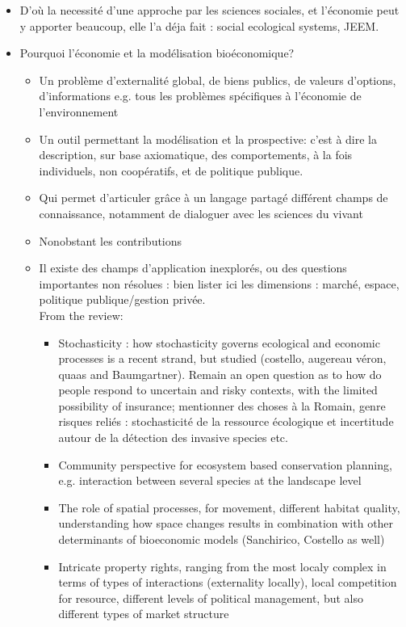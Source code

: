 \begin{itemize}
\item D'où la necessité d'une approche par les sciences sociales, et l'économie peut y apporter beaucoup, elle l'a déja fait : social ecological systems, JEEM. 
\item Pourquoi l'économie et la modélisation bioéconomique?
\begin{itemize}
\item Un problème d'externalité global, de biens publics, de valeurs d'options, d'informations e.g. tous les problèmes spécifiques à l'économie de l'environnement
\item Un outil permettant la modélisation et la prospective: c'est à dire la description, sur base axiomatique, des comportements, à la fois individuels, non coopératifs, et de politique publique. 
\item Qui permet d'articuler grâce à un langage partagé différent champs de connaissance, notamment de dialoguer avec les sciences du vivant
\item Nonobstant les contributions
\item Il existe des champs d'application inexplorés, ou des questions importantes non résolues : bien lister ici les dimensions : marché, espace, politique publique/gestion privée. \\
From the review:
\begin{itemize}
\item Stochasticity : how stochasticity governs ecological and economic processes is a recent strand, but studied (costello, augereau véron, quaas and Baumgartner). Remain an open question as to how do people respond to uncertain and risky contexts, with the limited possibility of insurance; mentionner des choses à la Romain, genre risques reliés : stochasticité de la ressource écologique et incertitude autour de la détection des invasive species etc. 
\item Community perspective for ecosystem based conservation planning, e.g. interaction between several species at the landscape level
\item The role of spatial processes, for movement, different habitat quality, understanding how space changes results in combination with other determinants of bioeconomic models (Sanchirico, Costello as well)
\item Intricate property rights, ranging from the most localy complex in terms of types of interactions (externality locally), local competition for resource, different levels of political management, but also different types of market structure


\end{itemize}
\end{itemize}
\end{itemize}
